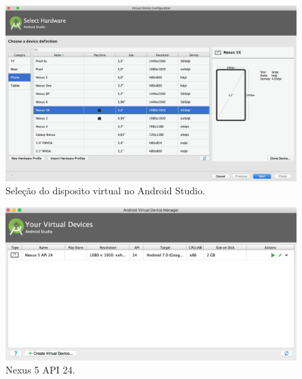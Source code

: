 	\begin{figure}[!htb]
       \begin{center}  
          \includegraphics[width=0.8\columnwidth]{img/selecao_dispositivo_virtual.png}
           \caption{\label{fig:selecao_dispositivo_virtual}Seleção do disposito virtual no Android Studio.}
       \end{center}
   \end{figure}
	\begin{figure}[!htb]
       \begin{center}  
          \includegraphics[width=0.8\columnwidth]{img/dispositivo_virtual.png}
           \caption{\label{fig:dispositivo_virtual}Nexus 5 API 24.}
       \end{center}
   \end{figure}
